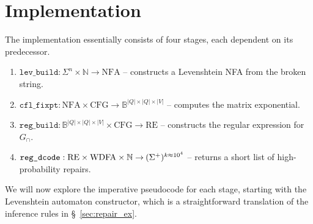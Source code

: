 \documentclass[popl.tex]{subfiles}
\begin{document}
\clearpage\section{Implementation}\label{sec:implementation}

The implementation essentially consists of four stages, each dependent on its predecessor.

\begin{enumerate}
  \item $\texttt{lev\_build}: \Sigma^n \times \mathbb{N} \rightarrow \text{NFA}$ -- constructs a Levenshtein NFA from the broken string.
  \item $\texttt{cfl\_fixpt}: \text{NFA} \times \text{CFG} \rightarrow \mathbb{B}^{|Q|\times |Q| \times |V|}$ -- computes the matrix exponential.
  \item $\texttt{reg\_build}: \mathbb{B}^{|Q|\times |Q| \times |V|} \times \text{CFG} \rightarrow \text{RE}$ -- constructs the regular expression for $G_\cap$.
  \item $\texttt{reg\_dcode}: \text{RE} \times \text{WDFA} \times \mathbb{N} \rightarrow\hspace{-0.02cm} (\Sigma^+)^{k\approx 10^4}$ -- returns a short list of high-probability repairs.
\end{enumerate}

\noindent We will now explore the imperative pseudocode for each stage, starting with the Levenshtein automaton constructor, which is a straightforward translation of the inference rules in \S~\ref{sec:repair_ex}.
\end{document}

